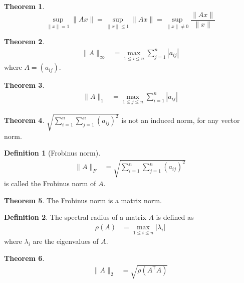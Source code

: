 \documentclass[fleqn, a4paper, 12pt, twoside, titlepage]{article}
\theoremstyle{definition}
\newtheorem{definition}{Definition}
\theoremstyle{theorem}
\newtheorem{theorem}{Theorem}
\begin{document}
\begin{theorem}
	\begin{equation*}
		\sup\limits_{\|x\| = 1} \|A x\| = \sup\limits_{\|x\| \le 1} \|A x\| = \sup\limits_{\|x\| \neq 0} \frac{\|A x\|}{\|x\|}
	\end{equation*}
\end{theorem}

\begin{theorem}
	\begin{align*}
		\|A\|_{\infty} &= \max\limits_{1 \le i \le n} \sum\limits_{j = 1}^{n} |a_{i j}|
	\end{align*}
	where $A = (a_{i j})$.
\end{theorem}

\begin{theorem}
	\begin{align*}
		\|A\|_1 &= \max\limits_{1 \le j \le n} \sum\limits_{i = 1}^{n} |a_{i j}|
	\end{align*}
\end{theorem}

\begin{theorem}
	$\sqrt{\sum\limits_{i = 1}^{n} \sum\limits_{j = 1}^{n} (a_{i j})^2}$ is not an induced norm, for any vector norm.
\end{theorem}

\begin{definition}[Frobinus norm]
	\begin{align*}
		\|A\|_F &= \sqrt{\sum\limits_{i = 1}^{n} \sum\limits_{j = 1}^{n} (a_{i j})^2}
	\end{align*}
	is called the Frobinus norm of $A$.
\end{definition}

\begin{theorem}
	The Frobinus norm is a matrix norm.
\end{theorem}

\begin{definition}
	The spectral radius of a matrix $A$ is defined as
	\begin{align*}
		\rho(A) &= \max\limits_{1 \le i \le n} |\lambda_i|
	\end{align*}
	where $\lambda_i$ are the eigenvalues of $A$.
\end{definition}

\begin{theorem}
	\begin{align*}
		\|A\|_2 &= \sqrt{\rho\left( A^{\mathsf{T}} A \right)}
	\end{align*}
\end{theorem}
\end{document}

